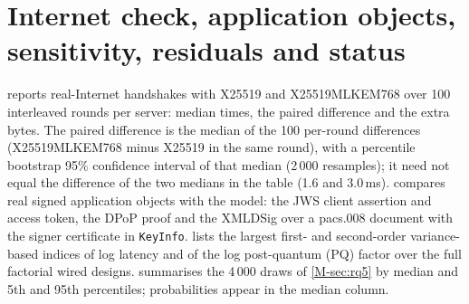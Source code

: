 \documentclass[preprint,12pt]{elsarticle}
\newcommand{\ms}{\,ms\xspace}
\begin{document}
\section{Internet check, application objects, sensitivity, residuals and status}
\label{app:more}
 reports real-Internet handshakes with X25519 and X25519\allowbreak{}MLKEM768 over 100 interleaved rounds per server: median times, the paired difference and the extra bytes. The paired difference is the median of the 100 per-round differences (X25519MLKEM768 minus X25519 in the same round), with a percentile bootstrap 95\% confidence interval of that median (2\,000 resamples); it need not equal the difference of the two medians in the table (1.6 and 3.0\ms).  compares real signed application objects with the model: the JWS client assertion and access token, the DPoP proof and the XMLDSig over a pacs.008 document with the signer certificate in \texttt{KeyInfo}.  lists the largest first- and second-order variance-based indices of log latency and of the log post-quantum (PQ) factor over the full factorial wired designs.  summarises the 4\,000 draws of \cref{M-sec:rq5} by median and 5th and 95th percentiles; probabilities appear in the median column.

\begin{table}[!htbp]\centering\small
\caption{Real-Internet handshakes.}
\label{tab:internet}
\end{table}
\end{document}
